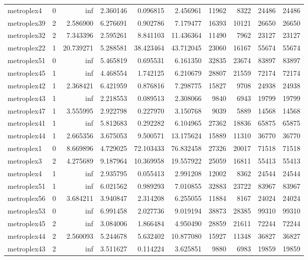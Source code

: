 \begin{longtable}{|l|r|r|r|r|r|r|r|r|r|}
metroplex4 & 0 & inf & 2.360146 & 0.096815 & 2.456961 & 11962 & 8322 & 24486 & 24486 \\
metroplex39 & 2 & 2.586900 & 6.276691 & 0.902786 & 7.179477 & 16393 & 10121 & 26650 & 26650 \\
metroplex32 & 2 & 7.343396 & 2.595261 & 8.841103 & 11.436364 & 11490 & 7962 & 23127 & 23127 \\
metroplex22 & 1 & 20.739271 & 5.288581 & 38.423464 & 43.712045 & 23060 & 16167 & 55674 & 55674 \\
metroplex51 & 0 & inf & 5.465819 & 0.695531 & 6.161350 & 32835 & 23674 & 83897 & 83897 \\
metroplex45 & 1 & inf & 4.468554 & 1.742125 & 6.210679 & 28807 & 21559 & 72174 & 72174 \\
metroplex42 & 1 & 2.368421 & 6.421959 & 0.876816 & 7.298775 & 15827 & 9708 & 24938 & 24938 \\
metroplex43 & 1 & inf & 2.218553 & 0.089513 & 2.308066 & 9840 & 6943 & 19799 & 19799 \\
metroplex47 & 1 & 3.555995 & 2.922798 & 0.227970 & 3.150768 & 9039 & 5889 & 14568 & 14568 \\
metroplex41 & 1 & inf & 5.812683 & 0.292282 & 6.104965 & 27362 & 18836 & 65875 & 65875 \\
metroplex44 & 1 & 2.665356 & 3.675053 & 9.500571 & 13.175624 & 15889 & 11310 & 36770 & 36770 \\
metroplex1 & 0 & 8.669896 & 4.729025 & 72.103433 & 76.832458 & 27326 & 20017 & 71518 & 71518 \\
metroplex3 & 2 & 4.275689 & 9.187964 & 10.369958 & 19.557922 & 25059 & 16811 & 55413 & 55413 \\
metroplex4 & 1 & inf & 2.935795 & 0.055413 & 2.991208 & 12002 & 8362 & 24544 & 24544 \\
metroplex51 & 1 & inf & 6.021562 & 0.989293 & 7.010855 & 32883 & 23722 & 83967 & 83967 \\
metroplex56 & 0 & 3.684211 & 3.940847 & 2.314208 & 6.255055 & 11884 & 8167 & 24024 & 24024 \\
metroplex53 & 0 & inf & 6.991458 & 2.027736 & 9.019194 & 38873 & 28385 & 99310 & 99310 \\
metroplex45 & 2 & inf & 3.084006 & 1.866484 & 4.950490 & 28859 & 21611 & 72244 & 72244 \\
metroplex44 & 2 & 2.560093 & 5.244678 & 5.632402 & 10.877080 & 15927 & 11348 & 36827 & 36827 \\
metroplex43 & 2 & inf & 3.511627 & 0.114224 & 3.625851 & 9880 & 6983 & 19859 & 19859 \\

\end{longtable}

